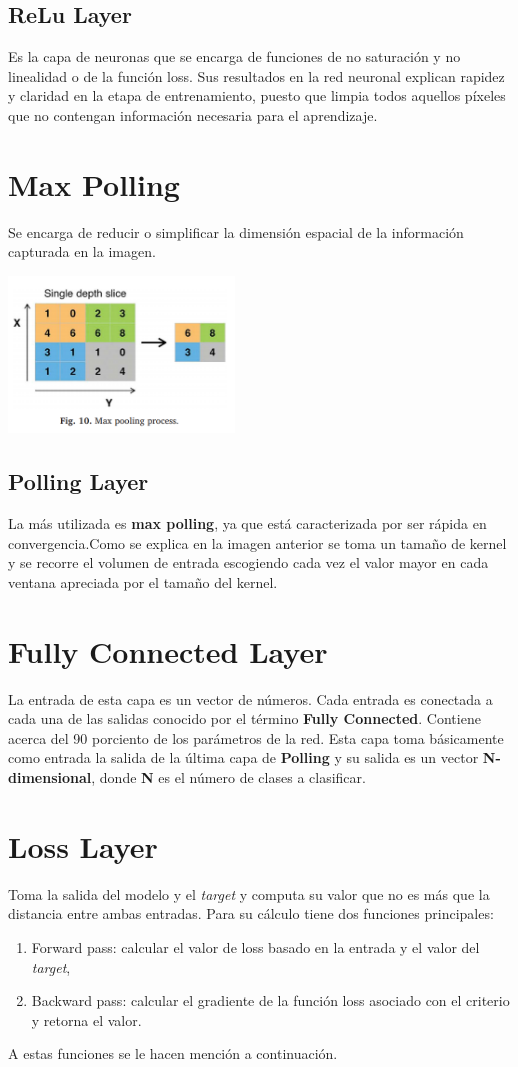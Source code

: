 \documentclass{book}
\begin{document}
			\subsection{ReLu Layer}
				Es la capa de neuronas que se encarga de funciones de no saturaci\'on y no linealidad o de la funci\'on loss. Sus resultados en la red neuronal explican rapidez y claridad en la etapa de entrenamiento, puesto que limpia todos aquellos p\'ixeles que no contengan informaci\'on necesaria para el aprendizaje.
		\section{Max Polling}
			Se encarga de reducir o simplificar la dimensi\'on espacial de la informaci\'on capturada en la imagen. 
			\begin{center}
				\includegraphics[width=6cm]{16.png}
			\end{center}
			\subsection{Polling Layer}
				La m\'as utilizada es \textbf{max polling}, ya que est\'a caracterizada por ser r\'apida en convergencia.Como se explica en la imagen anterior se toma un tama\~no de kernel y se recorre el volumen de entrada escogiendo cada vez el valor mayor en cada ventana apreciada por el tama\~no del kernel.
		\section{Fully Connected Layer}
			La entrada de esta capa es un vector de n\'umeros. Cada entrada es conectada a cada una de las salidas conocido por el t\'ermino \textbf{Fully Connected}. Contiene acerca del 90 porciento de los par\'ametros de la red. Esta capa toma b\'asicamente como entrada la salida de la \'ultima capa de \textbf{Polling} y su salida es un vector \textbf{N-dimensional}, donde \textbf{N} es el n\'umero de clases a clasificar.
		\section{Loss Layer}
			Toma la salida del modelo y el \textit{target} y computa su valor que no es m\'as que la distancia entre ambas entradas. Para su c\'alculo tiene dos funciones principales:
			\begin{enumerate}
			\item Forward pass: calcular el valor de loss basado en la entrada y el valor del \textit{target},
			\item Backward pass: calcular el gradiente de la funci\'on loss asociado con el criterio y retorna el valor.
			\end{enumerate}
			A estas funciones se le hacen menci\'on a continuaci\'on.
\end{document}
